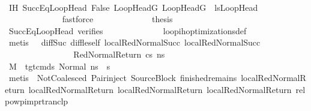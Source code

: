 \begin{isabellebody}
\ \ \ \ \ \ \ \ \ \ \ \ \isamarkupfalse%
\ IH\ SuccEqLoopHead\ False\ {\isacartoucheopen}{\isacharparenleft}{\kern0pt}LoopHeadG{\isacharcomma}{\kern0pt}\ LoopHeadG{\isacharprime}{\kern0pt}{\isacharparenright}{\kern0pt}\ {\isasymin}\ lsLoopHead{\isacartoucheclose}\ \isanewline
\ \ \ \ \ \ \ \ \ \ \ \ \isamarkupfalse%
\ fastforce\isanewline
\isanewline
\ \ \ \ \ \ \ \ \ \ \isamarkupfalse%
\ \isamarkupfalse%
\ {\isacharquery}{\kern0pt}thesis\isanewline
\ \ \ \ \ \ \ \ \ \ \ \ \isamarkupfalse%
\ SuccEqLoopHead\ verifies\isanewline
\ \ \ \ \ \ \ \ \ \ \ \ \isamarkupfalse%
\ loop{\isacharunderscore}{\kern0pt}ih{\isacharunderscore}{\kern0pt}optimizations{\isacharunderscore}{\kern0pt}def\isanewline
\ \ \ \ \ \ \ \ \ \ \ \ \isamarkupfalse%
\ {\isacharparenleft}{\kern0pt}metis\ {\isachardoublequoteopen}{}{\isachardoublequoteclose}{\isacharparenleft}{\kern0pt}{}{\isacharparenright}{\kern0pt}\ {\isachardoublequoteopen}{}{\isachardoublequoteclose}{\isacharparenleft}{\kern0pt}{}{\isacharparenright}{\kern0pt}\ diff{\isacharunderscore}{\kern0pt}Suc{\isacharunderscore}{\kern0pt}{}\ diff{\isacharunderscore}{\kern0pt}le{\isacharunderscore}{\kern0pt}self\ local{\isachardot}{\kern0pt}RedNormalSucc{\isacharparenleft}{\kern0pt}{}{\isacharparenright}{\kern0pt}\ local{\isachardot}{\kern0pt}RedNormalSucc{\isacharparenleft}{\kern0pt}{}{\isacharparenright}{\kern0pt}{\isacharparenright}{\kern0pt}\isanewline
\ \ \ \ \ \ \ \ \isamarkupfalse%
\isanewline
\ \ \ \ \ \ \isamarkupfalse%
\isanewline
\ \ \ \ \ \ \ \ \isamarkupfalse%
\ {\isacharparenleft}{\kern0pt}RedNormalReturn\ cs\ ns{\isacharprime}{\kern0pt}{\isacharparenright}{\kern0pt}\isanewline
\ \ \ \ \ \ \ \ \isamarkupfalse%
\ {\isachardoublequoteopen}M{\isacharcomma}{\kern0pt}{\isasymLambda}{\isacharcomma}{\kern0pt}{\isasymGamma}{\isacharcomma}{\kern0pt}{\isasymOmega}\ {\isasymturnstile}\ {\isasymlangle}tgt{\isacharunderscore}{\kern0pt}cmds{\isacharcomma}{\kern0pt}\ Normal\ ns{\isasymrangle}\ {\isacharbrackleft}{\kern0pt}{\isasymrightarrow}{\isacharbrackright}{\kern0pt}\ s{\isacharprime}{\kern0pt}{\isachardoublequoteclose}\isanewline
\ \ \ \ \ \ \ \ \ \ \isamarkupfalse%
\ {\isacharparenleft}{\kern0pt}metis\ {\isachardoublequoteopen}{}{\isachardoublequoteclose}{\isacharparenleft}{\kern0pt}{}{\isacharparenright}{\kern0pt}\ NotCoalesced\ Pair{\isacharunderscore}{\kern0pt}inject\ SourceBlock\ finished{\isacharunderscore}{\kern0pt}remains\ local{\isachardot}{\kern0pt}RedNormalReturn{\isacharparenleft}{\kern0pt}{}{\isacharparenright}{\kern0pt}\ local{\isachardot}{\kern0pt}RedNormalReturn{\isacharparenleft}{\kern0pt}{}{\isacharparenright}{\kern0pt}\ local{\isachardot}{\kern0pt}RedNormalReturn{\isacharparenleft}{\kern0pt}{}{\isacharparenright}{\kern0pt}\ local{\isachardot}{\kern0pt}RedNormalReturn{\isacharparenleft}{\kern0pt}{}{\isacharparenright}{\kern0pt}\ relpowp{\isacharunderscore}{\kern0pt}imp{\isacharunderscore}{\kern0pt}rtranclp{\isacharparenright}{\kern0pt}\isanewline

\end{isabellebody}
